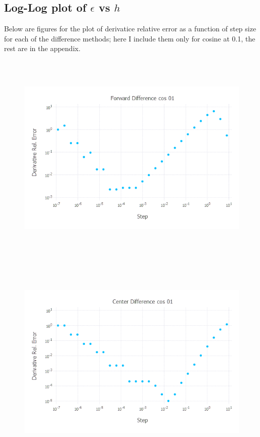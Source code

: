 \documentclass{article}
\begin{document}
\subsection{Log-Log plot of $\epsilon$ vs $h$}
Below are figures for the plot of derivatice relative error as a function of step size for each of the difference methods; here I include them only for cosine at 0.1, the rest are in the appendix. 
\begin{figure}[H]
	\includegraphics[width=6in,height=4in]{"forward cos 01"}
\end{figure}
\begin{figure}[H]
	\includegraphics[width=6in,height=4in]{"center cos 01"}
\end{figure}
\end{document}
